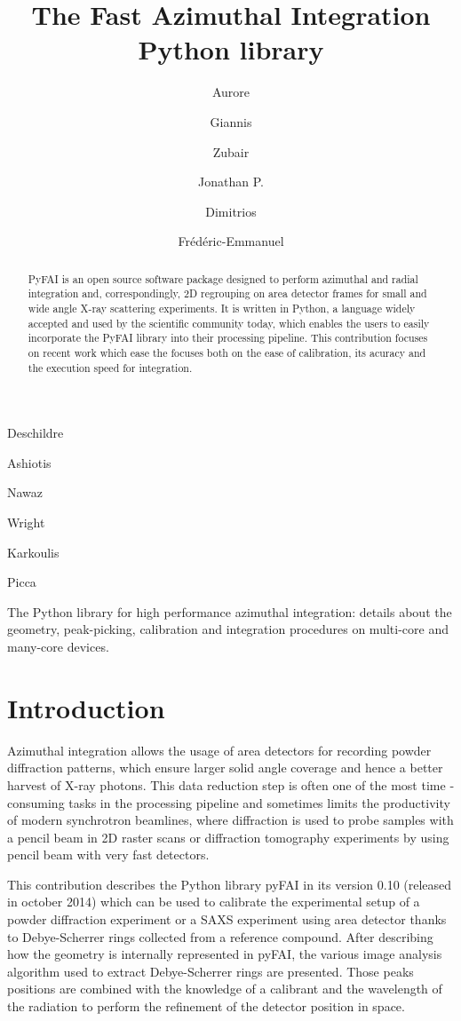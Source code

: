 \documentclass[preprint]{iucr}
\begin{document}
\title{The Fast Azimuthal Integration Python library}

    \author[a]{Aurore}{Deschildre}
    \author[a]{Giannis}{Ashiotis}
    \author[b]{Zubair}{Nawaz}
    \author[a]{Jonathan P.}{Wright}
    \author[a]{Dimitrios}{Karkoulis}
    \author[c]{Fr\'ed\'eric-Emmanuel}{Picca}

\maketitle

\begin{synopsis}
The Python library for high performance azimuthal integration: details about the
geometry, peak-picking, calibration and integration procedures on multi-core and
many-core devices.
\end{synopsis}

\begin{abstract}
PyFAI is an open source software package designed to perform azimuthal and
radial integration and, correspondingly, 2D regrouping on area detector frames for small and wide
angle X-ray scattering experiments. 
It is written in Python, a language widely accepted and used by the scientific 
community today, which enables the users to easily incorporate the PyFAI 
library into their processing pipeline. 
This contribution focuses on recent work which ease the focuses both on the
ease of calibration, its acuracy and the execution speed for integration.
\end{abstract}

\section{Introduction}
Azimuthal integration allows the usage of area detectors for recording powder
diffraction patterns, which  ensure larger solid angle coverage and hence a
better harvest of X­-ray photons.
This data reduction step is often one of the most time ­consuming tasks in the
processing pipeline and sometimes limits the productivity of modern synchrotron
beamlines, where diffraction is used to probe samples with a  pencil beam in 2D
raster scans or diffraction tomography experiments by using pencil beam with
very fast detectors.

This contribution describes the Python library pyFAI in its version 0.10
(released in october 2014) which can be used to calibrate the experimental
setup of a powder diffraction experiment or a SAXS experiment using area
detector thanks to Debye-Scherrer rings collected from a reference compound. 
After describing how the geometry is internally represented in pyFAI, the
various image analysis algorithm used to extract Debye-Scherrer rings are presented.
Those peaks positions are combined with the knowledge of a calibrant and the
wavelength of the radiation to perform the refinement of the detector position
in space.
\end{document}
